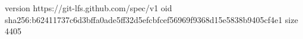 version https://git-lfs.github.com/spec/v1
oid sha256:b62411737c6d3bffa0ade5ff32d5efcbfcef56969f9368d15e5838b9405cf4e1
size 4405
